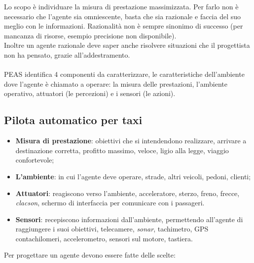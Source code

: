 \documentclass[10pt,a4paper]{book}
\begin{document}
Lo scopo \`e individuare la misura di prestazione massimizzata. Per farlo non \`e necessario che l'agente sia omniescente, basta che sia razionale e faccia del suo meglio con le informazioni. Razionalit\`a non \`e sempre sinonimo di successo (per mancanza di risorse, esempio precisione non disponibile).\\
Inoltre un agente razionale deve saper anche risolvere situazioni che il progettista non ha pensato, grazie all'addestramento.\\
\\
PEAS identifica 4 componenti da caratterizzare, le caratteristiche dell'ambiente dove l'agente \`e chiamato a operare: la misura delle prestazioni, l'ambiente operativo, attuatori (le percezioni) e i sensori (le azioni). 

\subsection{Pilota automatico per taxi}
\begin{itemize}
\item \textbf{Misura di prestazione}: obiettivi che si intendendono realizzare, arrivare a destinazione corretta, profitto massimo, veloce, ligio alla legge, viaggio confortevole;
\item \textbf{L'ambiente}: in cui l'agente deve operare, strade, altri veicoli, pedoni, clienti;
\item \textbf{Attuatori}: reagiscono verso l'ambiente, acceleratore, sterzo, freno, frecce, \textit{clacson}, schermo di interfaccia per comunicare con i passageri.
\item \textbf{Sensori}: recepiscono informazioni dall'ambiente, permettendo all'agente di raggiungere i suoi obiettivi, telecamere, \textit{sonar}, tachimetro, GPS contachilomeri, accelerometro, sensori sul motore, tastiera.
\end{itemize}
\noindent
Per progettare un agente devono essere fatte delle scelte:
\end{document}
